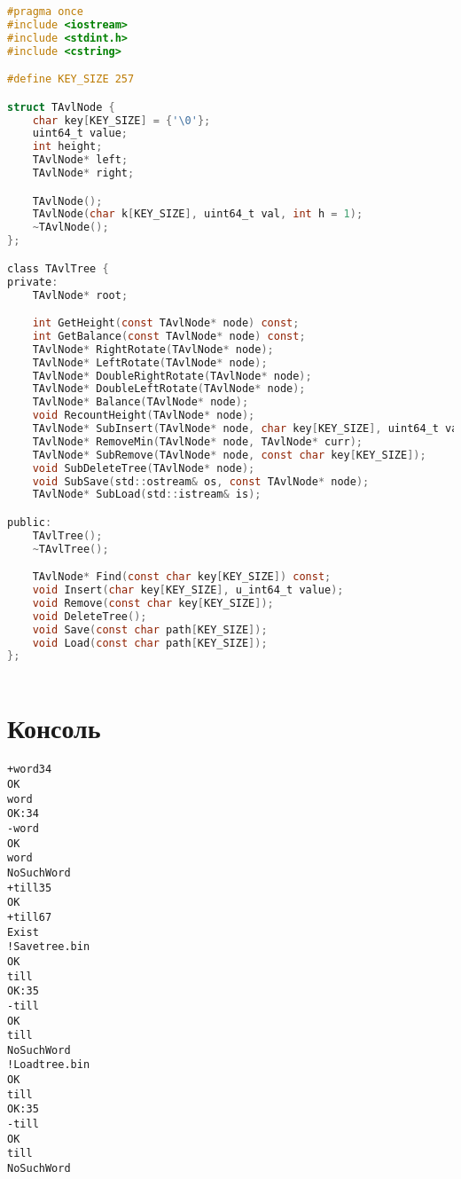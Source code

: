 \begin{lstlisting}[language=C]
#pragma once
#include <iostream>
#include <stdint.h>
#include <cstring>

#define KEY_SIZE 257

struct TAvlNode {
	char key[KEY_SIZE] = {'\0'};
	uint64_t value;
	int height;
	TAvlNode* left;
	TAvlNode* right;

	TAvlNode();
	TAvlNode(char k[KEY_SIZE], uint64_t val, int h = 1);
	~TAvlNode();
};

class TAvlTree {
private:
	TAvlNode* root;

	int GetHeight(const TAvlNode* node) const;
	int GetBalance(const TAvlNode* node) const;
	TAvlNode* RightRotate(TAvlNode* node);
	TAvlNode* LeftRotate(TAvlNode* node);
	TAvlNode* DoubleRightRotate(TAvlNode* node);
	TAvlNode* DoubleLeftRotate(TAvlNode* node);
	TAvlNode* Balance(TAvlNode* node);
	void RecountHeight(TAvlNode* node);
	TAvlNode* SubInsert(TAvlNode* node, char key[KEY_SIZE], uint64_t value);
	TAvlNode* RemoveMin(TAvlNode* node, TAvlNode* curr);
	TAvlNode* SubRemove(TAvlNode* node, const char key[KEY_SIZE]);
	void SubDeleteTree(TAvlNode* node);
	void SubSave(std::ostream& os, const TAvlNode* node);
	TAvlNode* SubLoad(std::istream& is);

public:
	TAvlTree();
	~TAvlTree();

	TAvlNode* Find(const char key[KEY_SIZE]) const;
	void Insert(char key[KEY_SIZE], u_int64_t value);
	void Remove(const char key[KEY_SIZE]);
	void DeleteTree();
	void Save(const char path[KEY_SIZE]);
	void Load(const char path[KEY_SIZE]);
};
	
\end{lstlisting}

\section{Консоль}
\begin{alltt}
+ word 34
OK
word
OK: 34
- word
OK
word
NoSuchWord
+ till 35
OK
+ till 67
Exist
! Save tree.bin
OK
till
OK: 35
- till
OK
till
NoSuchWord
! Load tree.bin
OK
till
OK: 35
- till
OK
till
NoSuchWord
\end{alltt}
\pagebreak

